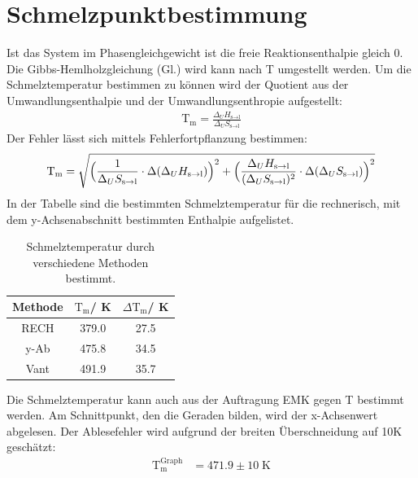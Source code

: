 \documentclass[12pt,a4paper,titlepage,headinclude,bibtotoc]{scrartcl}
\begin{document}
\section{Schmelzpunktbestimmung}
Ist das System im Phasengleichgewicht ist die freie Reaktionsenthalpie gleich 0. Die Gibbs-Hemlholzgleichung (Gl.) wird kann nach T umgestellt werden. Um die Schmelztemperatur bestimmen zu können wird der Quotient aus der Umwandlungsenthalpie und der Umwandlungsenthropie aufgestellt:
\begin{align}
\text{T}_{\text{m}}= \frac{\Delta_U H_{\text{s}\rightarrow\text{l}}}{\Delta_U S_{\text{s}\rightarrow\text{l}}}
\end{align}
Der Fehler lässt sich mittels Fehlerfortpflanzung bestimmen:
\begin{align}
\text{T}_{\text{m}}= \sqrt{\Bigl(\frac{1}{\Delta_U S_{\text{s}\rightarrow\text{l}}}\cdot \Delta(\Delta_U H_{\text{s}\rightarrow\text{l}})\Bigr)^2+\Bigl(\frac{\Delta_U H_{\text{s}\rightarrow\text{l}}}{(\Delta_U S_{\text{s}\rightarrow\text{l}})^2}\cdot \Delta(\Delta_U S_{\text{s}\rightarrow\text{l}})\Bigr)^2}
\end{align}
In der Tabelle\; sind die bestimmten Schmelztemperatur für die rechnerisch, mit dem y-Achsenabschnitt bestimmten Enthalpie aufgelistet.
\begin{table}[h]
\centering
\caption{Schmelztemperatur durch verschiedene Methoden bestimmt.}
\begin{tabular}{c|c|c}
Methode & $\text{T}_{\text{m}}$/ K& $\Delta\text{T}_{\text{m}}$/ K \\
\hline
RECH &379.0 &27.5 \\
y-Ab&475.8 & 34.5\\
Vant&491.9 & 35.7\\
\end{tabular}
\end{table}
\FloatBarrier
Die Schmelztemperatur kann auch aus der Auftragung EMK gegen T bestimmt werden. Am Schnittpunkt, den die Geraden bilden, wird der x-Achsenwert abgelesen. Der Ablesefehler wird aufgrund der breiten Überschneidung auf 10\;K geschätzt:
\begin{align}
\text{T}_{\text{m}}^{\text{Graph}}&= 471.9 \pm 10\;\text{K}
\end{align}
\end{document}
